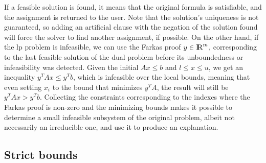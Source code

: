 \documentclass[runningheads]{llncs}
\begin{document}
If a feasible solution is found, it means that the original formula is satisfiable, and the assignment is returned to the user.
Note that the solution's uniqueness is not guaranteed, so adding an artificial clause with the negation of the solution found will force the solver to find another assignment, if possible.
On the other hand, if the \gls{lp} problem is infeasible, we can use the Farkas proof $y \in {\rm I\!R}^m$, corresponding to the last feasible solution of the dual problem before its unboundedness or infeasibility was detected.
Given the initial $Ax \le b$ and $l \le x \le u$, we get an inequality $y^T A x \le y^T b$, which is infeasible over the local bounds, meaning that even setting $x_i$ to the bound that minimizes $y^T A$, the result will still be $y^T A x > y^T b$.
Collecting the constraints corresponding to the indexes where the Farkas proof is non-zero and the minimizing bounds makes it possible to determine a small infeasible subsystem of the original problem, albeit not necessarily an irreducible one, and use it to produce an explanation.

\subsection{Strict bounds}
\label{sec:strict-bounds}
\end{document}

